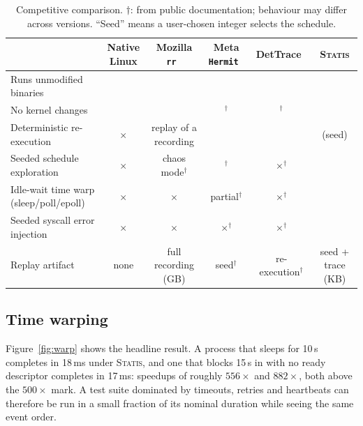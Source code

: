 \documentclass[10pt,twocolumn]{article}
\newcommand{\statis}{\textsc{Statis}}
\newcommand{\sys}[1]{\texttt{\detokenize{#1}}}
\newcommand{\yes}{\checkmark}
\newcommand{\no}{$\times$}
\begin{document}
\begin{table}[t]
\centering
\small
\caption{Competitive comparison. $\dagger$: from public documentation; behaviour may differ across versions. ``Seed'' means a user-chosen integer selects the schedule.}
\label{tab:compare}
\begin{tabular}{@{}l c c c c c@{}}
\toprule
 & Native Linux & Mozilla \texttt{rr}~\cite{rr} & Meta \texttt{Hermit}~\cite{hermit} & DetTrace~\cite{dettrace} & \statis{} \\
\midrule
Runs unmodified binaries & \yes & \yes & \yes & \yes & \yes \\
No kernel changes & \yes & \yes & \yes$^\dagger$ & \yes$^\dagger$ & \yes \\
Deterministic re-execution & \no & replay of a recording & \yes & \yes & \yes (seed) \\
Seeded schedule exploration & \no & chaos mode$^\dagger$ & \yes$^\dagger$ & \no$^\dagger$ & \yes \\
Idle-wait time warp (sleep/poll/epoll) & \no & \no & partial$^\dagger$ & \no$^\dagger$ & \yes \\
Seeded syscall error injection & \no & \no & \no$^\dagger$ & \no$^\dagger$ & \yes \\
Replay artifact & none & full recording (GB) & seed$^\dagger$ & re-execution$^\dagger$ & seed + trace (KB) \\
\bottomrule
\end{tabular}
\end{table}

\subsection{Time warping}
Figure~\ref{fig:warp} shows the headline result. A process that sleeps for 10\,s completes in 18\,ms under \statis{}, and one that blocks 15\,s in \sys{epoll_wait} with no ready descriptor completes in 17\,ms: speedups of roughly $556\times$ and $882\times$, both above the $500\times$ mark. A test suite dominated by timeouts, retries and heartbeats can therefore be run in a small fraction of its nominal duration while seeing the same event order.
\end{document}

